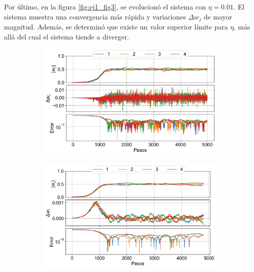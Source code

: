 \documentclass[aps,prb,twocolumn,superscriptaddress,floatfix,longbibliography]{revtex4-2}
\newcounter{para}
\begin{document}
Por último, en la figura \ref{fig:ej1_fig3}, se evolucionó el sistema con $\eta = 0.01$. El sistema muestra una convergencia más rápida y variaciones $\Delta w_j$ de mayor magnitud. Además, se determinó que existe un valor superior límite para $\eta$, más allá del cual el sistema tiende a diverger.

\begin{figure}
    \centering
    \begin{subfigure}[b]{0.3\textwidth}
        \centering
        \includegraphics[width=\textwidth]{ej1_fig1.png}
        \caption{\label{fig:ej1_fig1}}
    \end{subfigure}
    \hfill
    \begin{subfigure}[b]{0.3\textwidth}
        \centering
        \includegraphics[width=\textwidth]{ej1_fig2.png}
        \caption{\label{fig:ej1_fig2}}
    \end{subfigure}
    \hfill
    \begin{subfigure}[b]{0.3\textwidth}
        \centering

\end{subfigure}
\end{figure}
\end{document}
